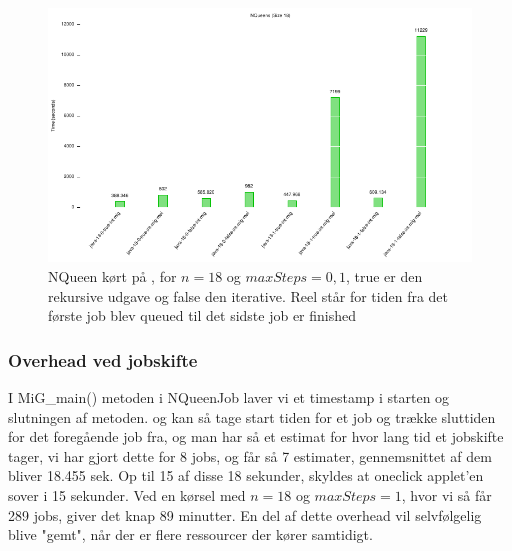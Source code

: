 
\begin{figure}[h]
\begin{center}
\includegraphics{../benchmarks/mig.pdf}
\caption{NQueen kørt på \mig, for $n=18$ og $maxSteps=0,1$, true er den
rekursive udgave og false den iterative. Reel står for tiden fra det første job
blev queued til det sidste job er finished}
\label{figur:mig}
\end{center}
\end{figure}



\subsubsection{Overhead ved jobskifte}

I MiG\_main() metoden i NQueenJob laver vi et timestamp i starten og slutningen
af metoden.  og kan så tage start tiden for et job og trække sluttiden for det
foregående job fra, og man har så et estimat for hvor lang tid et jobskifte
tager, vi har gjort dette for 8 jobs, og får så 7 estimater, gennemsnittet af
dem bliver 18.455 sek.  Op til 15 af disse 18 sekunder, skyldes at oneclick
applet'en sover i 15 sekunder.  Ved en kørsel med $n=18$ og $maxSteps=1$, hvor
vi så får 289 jobs, giver det knap 89 minutter. En del af dette overhead vil
selvfølgelig blive "gemt", når der er flere ressourcer der kører samtidigt.


